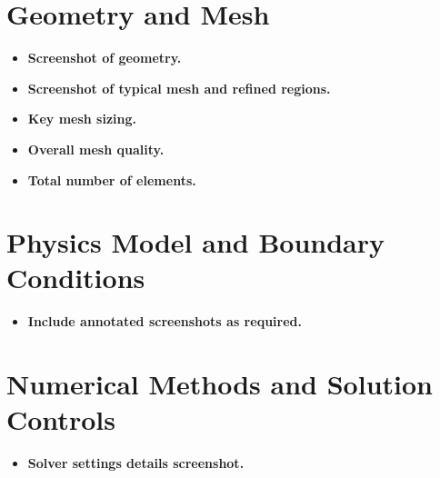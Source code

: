 \section*{Geometry and Mesh}
\begin{itemize}
    \item \textbf{Screenshot of geometry.}
    \item \textbf{Screenshot of typical mesh and refined regions.}
    \item \textbf{Key mesh sizing.}
    \item \textbf{Overall mesh quality.}
    \item \textbf{Total number of elements.}
\end{itemize}

\section*{Physics Model and Boundary Conditions}
\begin{itemize}
    \item \textbf{Include annotated screenshots as required.}
\end{itemize}

\section*{Numerical Methods and Solution Controls}
\begin{itemize}
    \item \textbf{Solver settings details screenshot.}
\end{itemize}